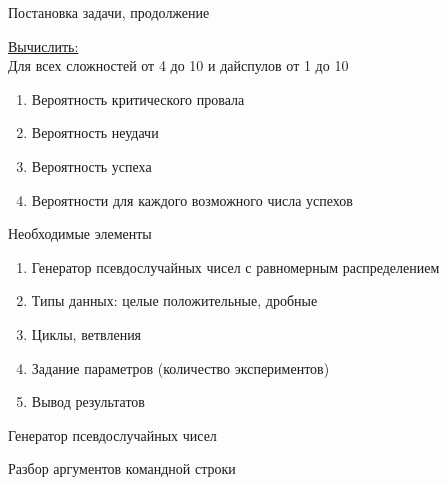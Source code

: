 \documentclass[unknownkeysallowed]{beamer}
\begin{document}
\begin{frame}{Постановка задачи, продолжение}

\underline{Вычислить:}\\ \vspace{0.5em}
Для всех сложностей от 4 до 10 и дайспулов от 1 до 10\vspace{0.5em}
\begin{enumerate}
  \item Вероятность критического провала\vspace{0.5em}
  \item Вероятность неудачи\vspace{0.5em}
  \item Вероятность успеха\vspace{0.5em}
  \item Вероятности для каждого возможного числа успехов\vspace{0.5em}
\end{enumerate}

\end{frame}

\begin{frame}{Необходимые элементы}

\begin{enumerate}
  \item Генератор псевдослучайных чисел с равномерным распределением
  \item Типы данных: целые положительные, дробные
  \item Циклы, ветвления
  \item Задание параметров (количество экспериментов)
  \item Вывод результатов
\end{enumerate}

\end{frame}

\begin{frame}[fragile]{Генератор псевдослучайных чисел}





\end{frame}

\begin{frame}[fragile]{Разбор аргументов командной строки}





\end{frame}
\end{document}

